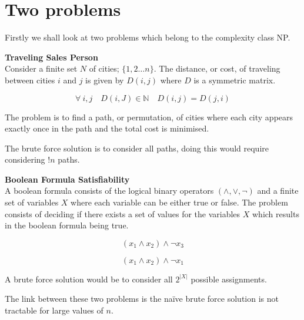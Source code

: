 \documentclass{article}
\theoremstyle{definition}
\begin{document}
\tableofcontents
\pagebreak

\section{Two problems}
Firstly we shall look at two problems which belong to the complexity class NP.

\textbf{Traveling Sales Person}\\
Consider a finite set $N$ of cities; $\{1, 2 \dots n\}$. The distance, or cost,
of traveling between cities $i$ and $j$ is given by $D(i,j)$ where $D$
is a symmetric matrix.

$$\forall\ i, j\quad D(i,J) \in \mathbb{N}\quad D(i,j) = D(j,i)$$

The problem is to find a path, or permutation, of
cities where each city appears exactly once in the path and the total
cost is minimised.

The brute force solution is to consider all paths, doing this would require
considering $!n$ paths.

\textbf{Boolean Formula Satisfiability}\\
A boolean formula consists of the logical binary operators $(\land, \lor, \neg)$
and a finite set of variables $X$ where each variable can be either true or false.
The problem consists of deciding if there exists a set of values for the variables $X$
which results in the boolean formula being true.

$$(x_1 \land x_2) \land \neg x_3$$

$$(x_1 \land x_2) \land \neg x_1$$

A brute force solution would be to consider all $2^{|X|}$ possible assignments.

The link between these two problems is the na\"ive brute force solution is not
tractable for large values of $n$.

\pagebreak


\pagebreak


\pagebreak


\pagebreak


\pagebreak


\pagebreak


\pagebreak


\pagebreak


\pagebreak

\end{document}
